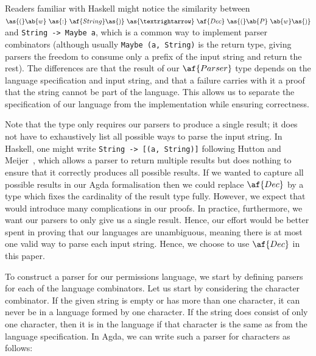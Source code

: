 \begin{remark}
Readers familiar with Haskell might notice the similarity between $\as{(}\ab{w}~\as{:}~\af{String}\as{)}~\as{→}~\af{Dec}~\as{(}\ab{P}~\ab{w}\as{)}$ and \verb|String -> Maybe a|, which is a common way to implement parser combinators (although usually \verb|Maybe (a, String)| is the return type, giving parsers the freedom to consume only a prefix of the input string and return the rest).
The differences are that the result of our $\af{Parser}$ type depends on the language specification and input string, and that a failure carries with it a proof that the string cannot be part of the language.
This allows us to separate the specification of our language from the implementation while ensuring correctness.
\end{remark}

\begin{remark}
Note that the  type only requires our parsers to produce a single
result; it does not have to exhaustively list all possible ways to parse the
input string. In Haskell, one might write \verb|String -> [(a, String)]| following Hutton and Meijer~\cite{monadic-parsing}, which allows a parser to return
multiple results but does nothing to ensure that it correctly produces all
possible results.
If we wanted to capture all possible results in our Agda formalisation then we
could replace $\af{Dec}$ by a type which fixes the cardinality of the result
type fully.
However, we expect that would introduce many complications in our proofs.
In practice, furthermore, we want our parsers to only give us a single result.
Hence, our effort would be better spent in proving that our languages are
unambiguous, meaning there is at most one valid way to parse each input string.
Hence, we choose to use $\af{Dec}$ in this paper.
\end{remark}

To construct a parser for our permissions language, we start by defining parsers for each of the language combinators. Let us start by considering the character combinator. If the given string is empty or has more than one character, it can never be in a language formed by one character. If the string does consist of only one character, then it is in the language if that character is the same as from the language specification. In Agda, we can write such a parser for characters as follows:


